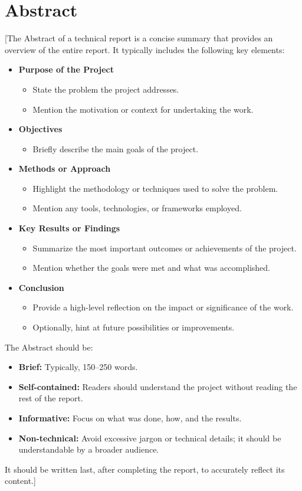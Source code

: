 \chapter*{Abstract}

[The Abstract of a technical report is a concise summary that provides an overview of the entire report. It typically includes the following key elements:
\begin{itemize}
    \item \textbf{Purpose of the Project}
    \begin{itemize}
        \item State the problem the project addresses.
        \item Mention the motivation or context for undertaking the work.
    \end{itemize}
    \item \textbf{Objectives}
    \begin{itemize}
        \item Briefly describe the main goals of the project.
    \end{itemize}
    \item \textbf{Methods or Approach}
    \begin{itemize}
        \item Highlight the methodology or techniques used to solve the problem.
        \item Mention any tools, technologies, or frameworks employed.
    \end{itemize}
    \item \textbf{Key Results or Findings}
    \begin{itemize}
        \item Summarize the most important outcomes or achievements of the project.
        \item Mention whether the goals were met and what was accomplished.
    \end{itemize}
    \item \textbf{Conclusion}
    \begin{itemize}
        \item Provide a high-level reflection on the impact or significance of the work.
        \item Optionally, hint at future possibilities or improvements.
    \end{itemize}
\end{itemize}

The Abstract should be:
\begin{itemize}
    \item \textbf{Brief:} Typically, 150--250 words.
    \item \textbf{Self-contained:} Readers should understand the project without reading the rest of the report.
    \item \textbf{Informative:} Focus on what was done, how, and the results.
    \item \textbf{Non-technical:} Avoid excessive jargon or technical details; it should be understandable by a broader audience.
\end{itemize}

It should be written last, after completing the report, to accurately reflect its content.]
